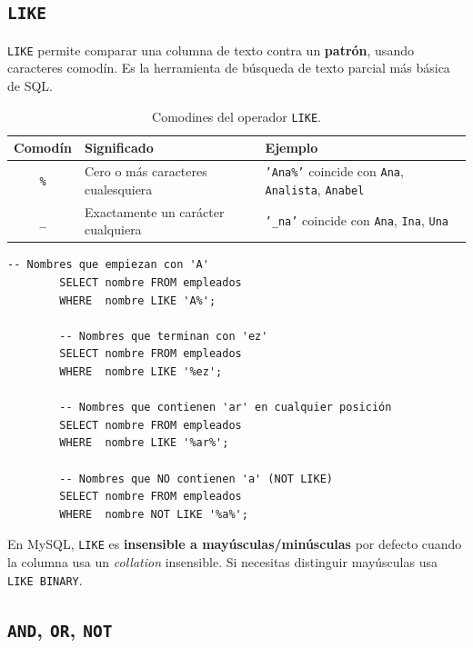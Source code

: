 \documentclass[12pt, a4paper]{article}
\begin{document}
	\subsection{\texttt{LIKE}}
	
	\texttt{LIKE} permite comparar una columna de texto contra un
	\textbf{patrón}, usando caracteres comodín.
	Es la herramienta de búsqueda de texto parcial más básica de SQL.
	
	\begin{table}[H]
		\centering
		\small
		\renewcommand{\arraystretch}{1.4}
		\begin{tabularx}{\linewidth}{@{} c l X @{}}
			\toprule
			\textbf{Comodín} & \textbf{Significado} & \textbf{Ejemplo} \\
			\midrule
			\texttt{\%} & Cero o más caracteres cualesquiera
			& \texttt{'Ana\%'} coincide con \texttt{Ana}, \texttt{Analista}, \texttt{Anabel} \\
			\texttt{\_} & Exactamente un carácter cualquiera
			& \texttt{'\_na'} coincide con \texttt{Ana}, \texttt{Ina}, \texttt{Una} \\
			\bottomrule
		\end{tabularx}
		\caption{Comodines del operador \texttt{LIKE}.}
		\label{tab:comodines-like}
	\end{table}
	
	\begin{lstlisting}[caption={Patrones con LIKE.}]
		-- Nombres que empiezan con 'A'
		SELECT nombre FROM empleados
		WHERE  nombre LIKE 'A%';
		
		-- Nombres que terminan con 'ez'
		SELECT nombre FROM empleados
		WHERE  nombre LIKE '%ez';
		
		-- Nombres que contienen 'ar' en cualquier posición
		SELECT nombre FROM empleados
		WHERE  nombre LIKE '%ar%';
		
		-- Nombres que NO contienen 'a' (NOT LIKE)
		SELECT nombre FROM empleados
		WHERE  nombre NOT LIKE '%a%';
	\end{lstlisting}
	
	\begin{nota}
		En MySQL, \texttt{LIKE} es \textbf{insensible a mayúsculas/minúsculas}
		por defecto cuando la columna usa un \textit{collation} insensible.
		Si necesitas distinguir mayúsculas usa \texttt{LIKE BINARY}.
	\end{nota}
	
	\subsection{\texttt{AND}, \texttt{OR}, \texttt{NOT}}
	
\end{document}
